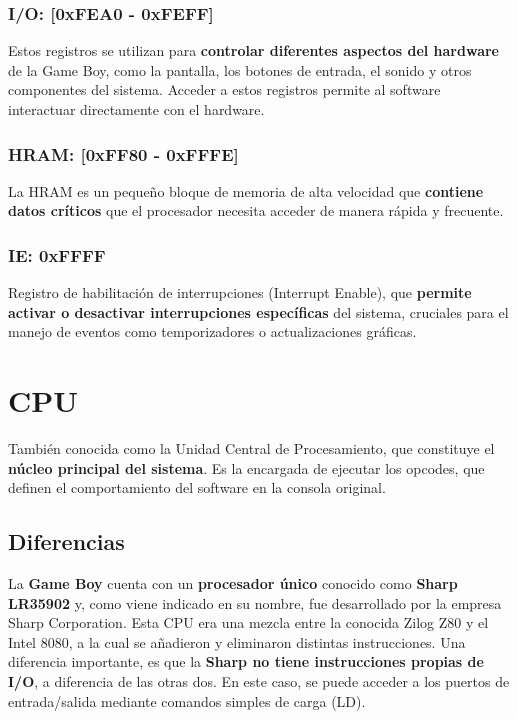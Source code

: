 \subsubsection{I/O: [0xFEA0 - 0xFEFF]}
Estos registros se utilizan para \textbf{controlar diferentes aspectos del hardware} de la Game Boy, como la pantalla, los botones de entrada, el sonido y otros componentes del sistema. Acceder a estos registros permite al software interactuar directamente con el hardware.

\subsubsection{HRAM: [0xFF80 - 0xFFFE]}
La HRAM es un pequeño bloque de memoria de alta velocidad que \textbf{contiene datos críticos} que el procesador necesita acceder de manera rápida y frecuente.

\subsubsection{IE: 0xFFFF}
Registro de habilitación de interrupciones (Interrupt Enable), que \textbf{permite activar o desactivar interrupciones específicas} del sistema, cruciales para el manejo de eventos como temporizadores o actualizaciones gráficas.

\section{CPU}

También conocida como la Unidad Central de Procesamiento, que constituye el \textbf{núcleo principal del sistema}. Es la encargada de ejecutar los opcodes, que definen el comportamiento del software en la consola original.

\subsection{Diferencias}

La \textbf{Game Boy} cuenta con un \textbf{procesador único} conocido como \textbf{Sharp LR35902} y, como viene indicado en su nombre, fue desarrollado por la empresa Sharp Corporation. Esta CPU era una mezcla entre la conocida Zilog Z80 y el Intel 8080, a la cual se añadieron y eliminaron distintas instrucciones. Una diferencia importante, es que la \textbf{Sharp no tiene instrucciones propias de I/O}, a diferencia de las otras dos. En este caso, se puede acceder a los puertos de entrada/salida mediante comandos simples de carga (LD).

